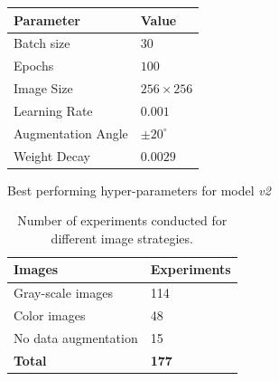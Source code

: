 \begin{table}
\vspace{1em}
\caption{Architecture of the sub-models considered in the final model architecture. }\label{tab:nn_structure}
\end{table}

\begin{margintable}
\begin{tabular}{@{}ll@{}}
\toprule
\textbf{Parameter} & \textbf{Value}   \\ \midrule
Batch size         & $30$             \\
Epochs             & $100$            \\
Image Size         & $256 \times 256$ \\
Learning Rate      & $0.001$            \\
Augmentation Angle & $\pm 20^{\circ}$ \\
Weight Decay       & $0.0029$         \\ \bottomrule
\end{tabular}
\caption{Best performing hyper-parameters for model \emph{v2}}\label{tab:hyperparam_rest}
\end{margintable}


\begin{table}[]
\centering
\begin{tabular}{@{}ll@{}}
\toprule
\textbf{Images} & \textbf{Experiments} \\ \midrule
Gray-scale images            & 114                  \\
Color images                 & 48                   \\
No data augmentation         & 15                   \\ \midrule
\textbf{Total}               & \textbf{177}         \\ \bottomrule
\end{tabular}
\caption{Number of experiments conducted for different image strategies.}\label{tab:experiments}
\end{table}


